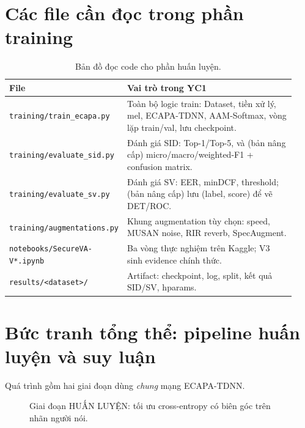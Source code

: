 \documentclass[12pt,a4paper]{article}
\begin{document}
\section{Các file cần đọc trong phần training}
\begin{table}[H]
\centering
\small
\begin{tabular}{p{0.27\linewidth}p{0.66\linewidth}}
\toprule
\textbf{File} & \textbf{Vai trò trong YC1} \\
\midrule
\texttt{training/train\_ecapa.py} & Toàn bộ logic train: Dataset, tiền xử lý, mel,
ECAPA-TDNN, AAM-Softmax, vòng lặp train/val, lưu checkpoint. \\
\texttt{training/evaluate\_sid.py} & Đánh giá SID: Top-1/Top-5, và (bản nâng cấp)
micro/macro/weighted-F1 + confusion matrix. \\
\texttt{training/evaluate\_sv.py} & Đánh giá SV: EER, minDCF, threshold; (bản nâng
cấp) lưu (label, score) để vẽ DET/ROC. \\
\texttt{training/augmentations.py} & Khung augmentation tùy chọn: speed, MUSAN
noise, RIR reverb, SpecAugment. \\
\texttt{notebooks/SecureVA-V*.ipynb} & Ba vòng thực nghiệm trên
Kaggle; V3 sinh evidence chính thức. \\
\texttt{results/<dataset>/} & Artifact: checkpoint, log, split, kết quả
SID/SV, hparams. \\
\bottomrule
\end{tabular}
\caption{Bản đồ đọc code cho phần huấn luyện.}
\end{table}

\section{Bức tranh tổng thể: pipeline huấn luyện và suy luận}
Quá trình gồm hai giai đoạn dùng \emph{chung} mạng ECAPA-TDNN.

\begin{figure}[H]
\centering
{}
\caption{Giai đoạn HUẤN LUYỆN: tối ưu cross-entropy có biên góc trên nhãn người nói.}
\end{figure}
\end{document}
